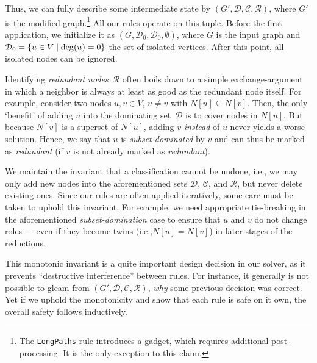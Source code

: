 \documentclass[a4paper, USenglish, cleveref, autoref, thm-restate, noalgorithm2e]{socg-lipics-v2021}
\newcommand{\setc}[2]{\ensuremath\left\{#1\;\middle|\;#2\right\}}
\def\deg{\ensuremath{\mathrm{deg}}}
\newcommand{\ie}{i.e.,\xspace}
\newcommand{\domset}{\ensuremath{\mathcal D}\xspace}
\newcommand{\cov}{\ensuremath{\mathcal C}\xspace}
\newcommand{\red}{\ensuremath{\mathcal R}\xspace}
\begin{document}
Thus, we can fully describe some intermediate state by $(G', \domset, \cov, \red)$, where $G'$ is the modified graph.\footnote{%
    The \texttt{LongPaths} rule introduces a gadget, which requires additional post-processing.
    It is the only exception to this claim.
}
All our rules operate on this tuple.
Before the first application, we initialize it as $(G, \domset_0, \domset_0, \emptyset)$, where $G$ is the input graph and $\domset_0 = \setc{u \in V}{\deg(u) = 0}$ the set of isolated vertices.
After this point, all isolated nodes can be ignored.

Identifying \emph{redundant nodes}~$\red$ often boils down to a simple exchange-argument in which a neighbor is always at least as good as the redundant node itself.
For example, consider two nodes $u, v \in V$, $u \neq v$ with $N[u] \subseteq N[v]$.
Then, the only `benefit' of adding $u$ into the dominating set~\domset is to cover nodes in $N[u]$.
But because $N[v]$ is a superset of $N[u]$, adding $v$ \emph{instead} of $u$ never yields a worse solution.
Hence, we say that $u$ is \emph{subset-dominated} by $v$ and can thus be marked as \emph{redundant} (if $v$ is not already marked as \emph{redundant}).

We maintain the invariant that a classification cannot be undone, \ie we may only add new nodes into the aforementioned sets \domset, \cov, and \red, but never delete existing ones.
Since our rules are often applied iteratively, some care must be taken to uphold this invariant.
For example, we need appropriate tie-breaking in the aforementioned \emph{subset-domination} case to ensure that $u$ and $v$ do not change roles
--- even if they become twins (\ie $N[u] = N[v]$) in later stages of the reductions.

This monotonic invariant is a quite important design decision in our solver, as it prevents ``destructive interference'' between rules.
For instance, it generally is not possible to gleam from $(G', \domset, \cov, \red)$, \emph{why} some previous decision was correct.
Yet if we uphold the monotonicity and show that each rule is safe on it own, the overall safety follows inductively.
\end{document}
